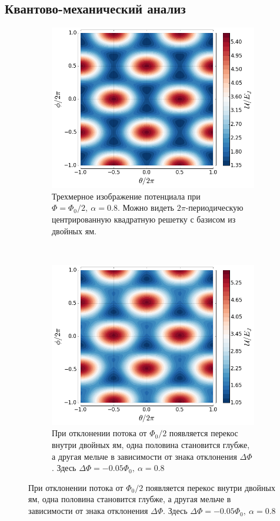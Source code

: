 \documentclass[12pt, twoside]{report}
\numberwithin{equation}{section}
\numberwithin{figure}{section}
\begin{document}
\subsection{Квантово-механический анализ}

\begin{figure}[!p]

\begingroup
\captionsetup[subfigure]{width=0.9\textwidth, justification=normal}
\centering
\begin{subfigure}[t]{0.49\linewidth}
\centering
\includegraphics[height = .8\textwidth]{Pictures/qubit_potential}
\caption{Трехмерное изображение потенциала при $\Phi = \Phi_0/2,\ \alpha=0.8$. Можно видеть $2\pi$-периодическую центрированную квадратную решетку с базисом из двойных ям.}
\label{fig:U3d}
\end{subfigure}~
\begin{subfigure}[t]{0.49\linewidth}
\centering
\includegraphics[height = .8\textwidth]{Pictures/qubit_potential2}
\caption{При отклонении потока от $\Phi_0/2$ появляется перекос внутри двойных ям, одна половина становится глубже, а другая мельче в зависимости от знака отклонения $\Delta\Phi$. Здесь $\Delta\Phi=-0.05\Phi_0,\ \alpha=0.8$}
\label{fig:U3d2}
\end{subfigure}


\end{figure}
\end{document}
